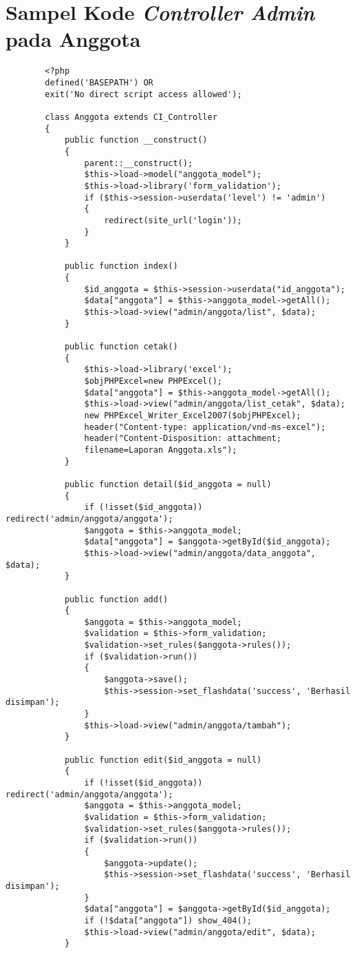 \chapter{Sampel Kode \textit{Controller Admin} pada Anggota}
\begin{verbatim}
		<?php		
		defined('BASEPATH') OR 
		exit('No direct script access allowed');
				
		class Anggota extends CI_Controller
		{
			public function __construct()
			{
				parent::__construct();
				$this->load->model("anggota_model");
				$this->load->library('form_validation');
				if ($this->session->userdata('level') != 'admin') 
				{
					redirect(site_url('login'));
				}
			}
			
			public function index()
			{
				$id_anggota = $this->session->userdata("id_anggota");
				$data["anggota"] = $this->anggota_model->getAll();
				$this->load->view("admin/anggota/list", $data);
			}
			
			public function cetak()
			{
				$this->load->library('excel');
				$objPHPExcel=new PHPExcel();
				$data["anggota"] = $this->anggota_model->getAll();
				$this->load->view("admin/anggota/list_cetak", $data);
				new PHPExcel_Writer_Excel2007($objPHPExcel);
				header("Content-type: application/vnd-ms-excel");
				header("Content-Disposition: attachment; 
				filename=Laporan Anggota.xls");
			}
			
			public function detail($id_anggota = null)
			{
				if (!isset($id_anggota)) redirect('admin/anggota/anggota');
				$anggota = $this->anggota_model;
				$data["anggota"] = $anggota->getById($id_anggota);
				$this->load->view("admin/anggota/data_anggota", $data);
			}
				
			public function add()
			{
				$anggota = $this->anggota_model;
				$validation = $this->form_validation;
				$validation->set_rules($anggota->rules());
				if ($validation->run()) 
				{
					$anggota->save();
					$this->session->set_flashdata('success', 'Berhasil disimpan');
				}
				$this->load->view("admin/anggota/tambah");
			}
			
			public function edit($id_anggota = null)
			{
				if (!isset($id_anggota)) redirect('admin/anggota/anggota');		
				$anggota = $this->anggota_model;
				$validation = $this->form_validation;
				$validation->set_rules($anggota->rules());
				if ($validation->run()) 
				{
					$anggota->update();
					$this->session->set_flashdata('success', 'Berhasil disimpan');
				}
				$data["anggota"] = $anggota->getById($id_anggota);
				if (!$data["anggota"]) show_404();
				$this->load->view("admin/anggota/edit", $data);
			}
			

\end{verbatim}
